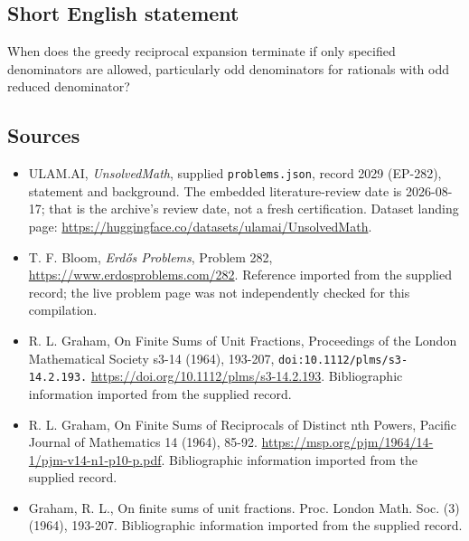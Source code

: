 \documentclass[11pt,a4paper]{article}
\begin{document}
\subsection{Short English statement}

When does the greedy reciprocal expansion terminate if only specified denominators are allowed, particularly odd denominators for rationals with odd reduced denominator?

\subsection{Sources}

{\small

\begin{itemize}

\item[\hypertarget{source:2029:1}{S1}] ULAM.AI, \emph{UnsolvedMath}, supplied \texttt{problems.json}, record 2029 (EP-282), statement and background. The embedded literature-review date is 2026-08-17; that is the archive’s review date, not a fresh certification. Dataset landing page: \url{https://huggingface.co/datasets/ulamai/UnsolvedMath}.

\item[\hypertarget{source:2029:2}{S2}] T. F. Bloom, \emph{Erdős Problems}, Problem 282, \url{https://www.erdosproblems.com/282}. Reference imported from the supplied record; the live problem page was not independently checked for this compilation.

\item[\hypertarget{source:2029:3}{S3}] R. L. Graham, On Finite Sums of Unit Fractions, Proceedings of the London Mathematical Society s3-14 (1964), 193-207, \nolinkurl{doi:10.1112/plms/s3-14.2.193.} \url{https://doi.org/10.1112/plms/s3-14.2.193}. Bibliographic information imported from the supplied record.

\item[\hypertarget{source:2029:4}{S4}] R. L. Graham, On Finite Sums of Reciprocals of Distinct nth Powers, Pacific Journal of Mathematics 14 (1964), 85-92. \url{https://msp.org/pjm/1964/14-1/pjm-v14-n1-p10-p.pdf}. Bibliographic information imported from the supplied record.

\item[\hypertarget{source:2029:5}{S5}] Graham, R. L., On finite sums of unit fractions. Proc. London Math. Soc. (3) (1964), 193-207. Bibliographic information imported from the supplied record.

\end{itemize}

}

\label{end:2029}
\end{document}
